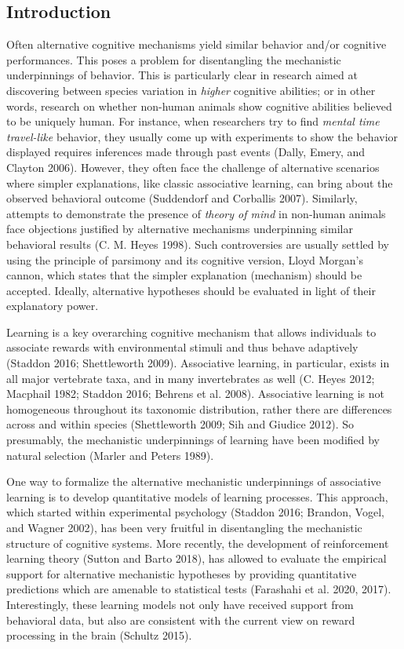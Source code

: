 \documentclass[
  12pt,
]{article}
\begin{document}
\newpage

\hypertarget{introduction}{%
\subsection{Introduction}\label{introduction}}

Often alternative cognitive mechanisms yield similar behavior and/or
cognitive performances. This poses a problem for disentangling the
mechanistic underpinnings of behavior. This is particularly clear in
research aimed at discovering between species variation in \emph{higher}
cognitive abilities; or in other words, research on whether non-human
animals show cognitive abilities believed to be uniquely human. For
instance, when researchers try to find \emph{mental time travel-like}
behavior, they usually come up with experiments to show the behavior
displayed requires inferences made through past events (Dally, Emery,
and Clayton 2006). However, they often face the challenge of alternative
scenarios where simpler explanations, like classic associative learning,
can bring about the observed behavioral outcome (Suddendorf and
Corballis 2007). Similarly, attempts to demonstrate the presence of
\emph{theory of mind} in non-human animals face objections justified by
alternative mechanisms underpinning similar behavioral results (C. M.
Heyes 1998). Such controversies are usually settled by using the
principle of parsimony and its cognitive version, Lloyd Morgan's cannon,
which states that the simpler explanation (mechanism) should be
accepted. Ideally, alternative hypotheses should be evaluated in light
of their explanatory power.

Learning is a key overarching cognitive mechanism that allows
individuals to associate rewards with environmental stimuli and thus
behave adaptively (Staddon 2016; Shettleworth 2009). Associative
learning, in particular, exists in all major vertebrate taxa, and in
many invertebrates as well (C. Heyes 2012; Macphail 1982; Staddon 2016;
Behrens et al. 2008). Associative learning is not homogeneous throughout
its taxonomic distribution, rather there are differences across and
within species (Shettleworth 2009; Sih and Giudice 2012). So presumably,
the mechanistic underpinnings of learning have been modified by natural
selection (Marler and Peters 1989).

One way to formalize the alternative mechanistic underpinnings of
associative learning is to develop quantitative models of learning
processes. This approach, which started within experimental psychology
(Staddon 2016; Brandon, Vogel, and Wagner 2002), has been very fruitful
in disentangling the mechanistic structure of cognitive systems. More
recently, the development of reinforcement learning theory (Sutton and
Barto 2018), has allowed to evaluate the empirical support for
alternative mechanistic hypotheses by providing quantitative predictions
which are amenable to statistical tests (Farashahi et al. 2020, 2017).
Interestingly, these learning models not only have received support from
behavioral data, but also are consistent with the current view on reward
processing in the brain (Schultz 2015).
\end{document}

